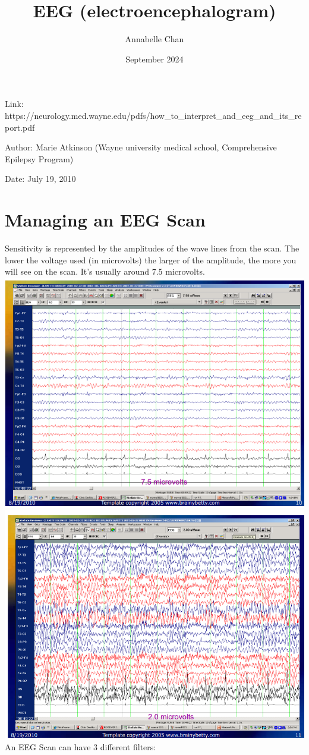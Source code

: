 \documentclass[12pt]{article}
\title{EEG (electroencephalogram)}
\author{Annabelle Chan}
\date{September 2024}
\begin{document}
\maketitle
Link: https://neurology.med.wayne.edu/pdfs/how\_to\_interpret\_and\_eeg\_and\_its\_report.pdf

Author: Marie Atkinson (Wayne university medical school, Comprehensive Epilepsy Program)

Date: July 19, 2010

\section{Managing an EEG Scan}
Sensitivity is represented by the amplitudes of the wave lines from the scan. The lower the voltage used (in microvolts) the larger of the amplitude, the more you will see on the scan. It's usually around 7.5 microvolts.
\includegraphics[scale=0.5]{lowSensitivity}
\includegraphics[scale=0.4]{highSensitivity}
\medskip
	An EEG Scan can have 3 different filters:
\end{document}
